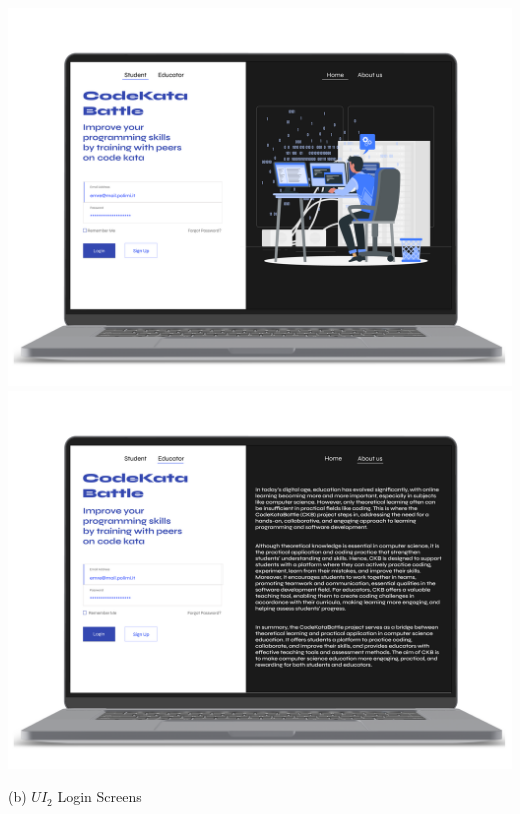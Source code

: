 \begin{center}
    \includegraphics[scale=0.13]{Images/ui-ux/student_login.png}
    \includegraphics[scale=0.13]{Images/ui-ux/educator_login.png}
\end{center}
    \begin{center}
        (b) $UI_{2}$ Login Screens
    \end{center}

